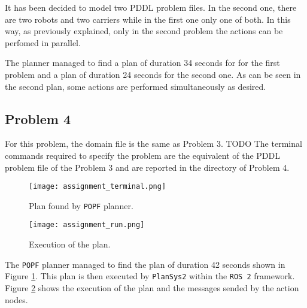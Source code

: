 It has been decided to model two PDDL problem files.
In the second one, there are two robots and two carriers while in the first one only one of both.
In this way, as previously explained, only in the second problem the actions can be perfomed in parallel.

The planner managed to find a plan of duration 34 seconds for for the first problem and a plan of
duration 24 seconds for the second one.
As can be seen in the second plan, some actions are performed simultaneously as desired.

\subsection{Problem 4}
For this problem, the domain file is the same as Problem 3. TODO
The terminal commands required to specify the problem are the equivalent of the PDDL problem file of the 
Problem 3 and are reported in the directory of Problem 4.


\begin{figure}[htbp]
\centerline{\texttt{[image: assignment\_terminal.png]}}
\caption{Plan found by \texttt{POPF} planner.}
\label{fig:plan}
\end{figure}
    
\begin{figure}[htbp]
\centerline{\texttt{[image: assignment\_run.png]}}
\caption{Execution of the plan.}
\label{fig:execution}
\end{figure}

The \texttt{POPF} planner managed to find the plan of duration 42 seconds shown in Figure \ref{fig:plan}.  
This plan is then executed by \texttt{PlanSys2} within the \texttt{ROS 2} framework. Figure 
\ref{fig:execution} shows the execution of the plan and the messages sended by the action nodes.
